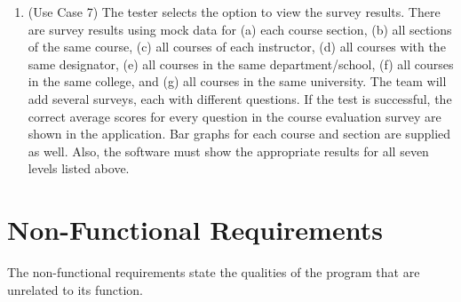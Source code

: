 \documentclass{article}
\begin{document}
\begin{enumerate}
  \item (Use Case 7) The tester selects the option to view the survey results. There are survey results using mock data for (a) each course section, (b) all sections of the same course, (c) all courses of each instructor, (d) all courses with the same designator, (e) all courses in the same department/school, (f) all courses in the same college, and (g) all courses in the same university. The team will add several surveys, each with different questions. If the test is successful, the correct average scores for every question in the course evaluation survey are shown in the application. Bar graphs for each course and section are supplied as well. Also, the software must show the appropriate results for all seven levels listed above.
\end{enumerate}

\newpage
\section{Non-Functional Requirements}

The non-functional requirements state the qualities of the program that are unrelated to its function.
\end{document}

